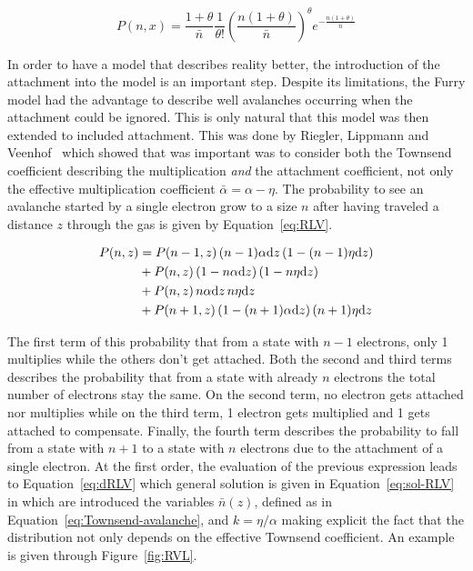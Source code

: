 	\begin{equation}
	\label{eq:Polya-P}
	P(n,x) = \frac{1+\theta}{\bar{n}}\frac{1}{\theta !} \left( \frac{n(1+\theta)}{\bar{n}} \right)^\theta e^{-\frac{n(1+\theta)}{\bar{n}}}
	\end{equation}
	
	In order to have a model that describes reality better, the introduction of the attachment into the model is an important step. Despite its limitations, the Furry model had the advantage to describe well avalanches occurring when the attachment could be ignored. This is only natural that this model was then extended to included attachment. This was done by Riegler, Lippmann and Veenhof~\cite{RIEGLER2003} which showed that was important was to consider both the Townsend coefficient describing the multiplication \textit{and} the attachment coefficient, not only the effective multiplication coefficient $\bar{\alpha} = \alpha - \eta$. The probability to see an avalanche started by a single electron grow to a size $n$ after having traveled a distance $z$ through the gas is given by Equation~\ref{eq:RLV}.
	
	\begin{equation}
	\label{eq:RLV}
		\begin{aligned}
		P(n,z) &= P(n-1,z) \, (n-1)\alpha\mathrm{d}{z} \, (1-(n-1)\eta\mathrm{d}{z})\\
			   &+ P(n,z)   \, (1-n\alpha\mathrm{d}{z}) \, (1-n\eta\mathrm{d}{z})\\
			   &+ P(n,z)   \, n\alpha\mathrm{d}{z} \, n\eta\mathrm{d}{z}\\
			   &+ P(n+1,z) \, (1-(n+1)\alpha\mathrm{d}{z}) \, (n+1)\eta\mathrm{d}{z}
		\end{aligned}
	\end{equation}
	
	The first term of this probability that from a state with $n-1$ electrons, only 1 multiplies while the others don't get attached. Both the second and third terms describes the probability that from a state with already $n$ electrons the total number of electrons stay the same. On the second term, no electron gets attached nor multiplies while on the third term, 1 electron gets multiplied and 1 gets attached to compensate. Finally, the fourth term describes the probability to fall from a state with $n+1$ to a state with $n$ electrons due to the attachment of a single electron. At the first order, the evaluation of the previous expression leads to Equation~\ref{eq:dRLV} which general solution is given in Equation~\ref{eq:sol-RLV} in which are introduced the variables $\bar{n}(z)$, defined as in Equation~\ref{eq:Townsend-avalanche}, and $k = \eta/\alpha$ making explicit the fact that the distribution not only depends on the effective Townsend coefficient. An example is given through Figure~\ref{fig:RVL}.
	
